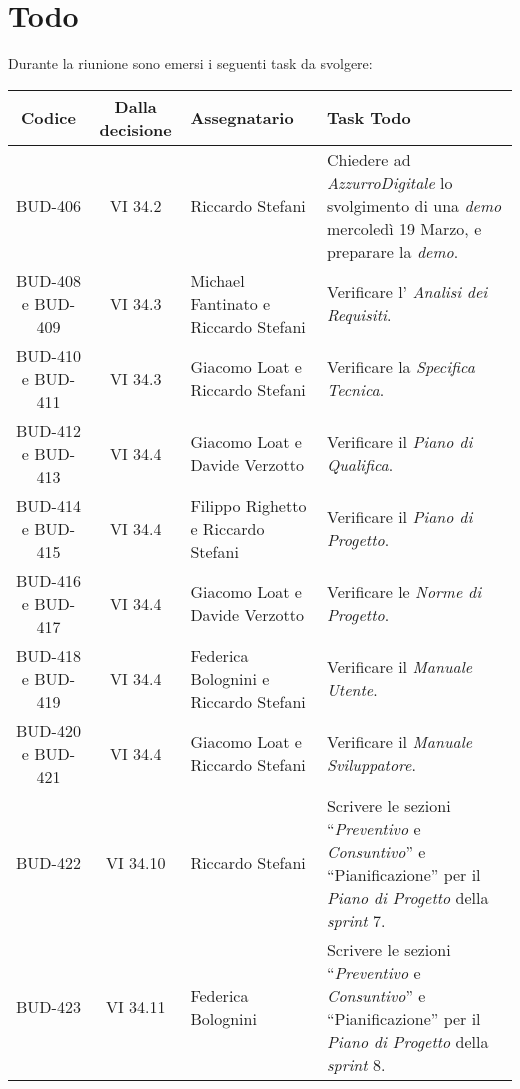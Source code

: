 
\section{Todo}

Durante la riunione sono emersi i seguenti task da svolgere:

\vspace{0.5cm}

\begin{table}[htbp]
\centering
{}
\begin{tabular}{|c|c|p{}|p{}|}
    \hline
    \rowcolor[gray]{0.75}
    \textbf{Codice} & \textbf{Dalla decisione} & \textbf{Assegnatario} & \textbf{Task Todo} \\
    \hline
    BUD-406 & VI 34.2 & Riccardo Stefani & Chiedere ad \emph{AzzurroDigitale} lo svolgimento di una \emph{demo} mercoledì 19 Marzo, e preparare la \emph{demo}.\\
    \hline
    BUD-408 e BUD-409 & VI 34.3 & Michael Fantinato e Riccardo Stefani & Verificare l' \emph{Analisi dei Requisiti}.\\
    \hline
    BUD-410 e BUD-411 & VI 34.3 & Giacomo Loat e Riccardo Stefani & Verificare la \emph{Specifica Tecnica}. \\
    \hline 
    BUD-412 e BUD-413 & VI 34.4 & Giacomo Loat e Davide Verzotto & Verificare il \emph{Piano di Qualifica}. \\
    \hline
    BUD-414 e BUD-415 & VI 34.4 & Filippo Righetto e Riccardo Stefani & Verificare il \emph{Piano di Progetto}. \\
    \hline
    BUD-416 e BUD-417 & VI 34.4 & Giacomo Loat e Davide Verzotto & Verificare le \emph{Norme di Progetto}. \\
    \hline
    BUD-418 e BUD-419 & VI 34.4 & Federica Bolognini e Riccardo Stefani & Verificare il \emph{Manuale Utente}. \\
    \hline
    BUD-420 e BUD-421 & VI 34.4 & Giacomo Loat e Riccardo Stefani & Verificare il \emph{Manuale Sviluppatore}. \\
    \hline
    BUD-422 & VI 34.10 & Riccardo Stefani & Scrivere le sezioni “\emph{Preventivo} e \emph{Consuntivo}” e “Pianificazione” per il \emph{Piano di Progetto} della \emph{sprint} 7.\\
    \hline
    BUD-423 & VI 34.11 & Federica Bolognini & Scrivere le sezioni “\emph{Preventivo} e \emph{Consuntivo}” e “Pianificazione” per il \emph{Piano di Progetto} della \emph{sprint} 8.\\

\end{tabular}
\end{table}
